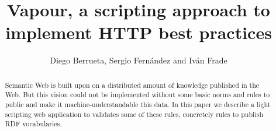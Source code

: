 \documentclass{../templates/llncs}
\begin{document}
\title{Vapour, a scripting  approach to implement HTTP best practices}

\author{Diego Berrueta, Sergio Fern\'andez and Iv\'an Frade}


\maketitle

\begin{abstract}
Semantic Web is built upon on a distributed amount of knowledge published in the 
Web. But this vision could not be implemented without some basic norms and rules 
to public and make it machine-understandable this data. In this paper we describe 
a light scripting web application to validates some of these rules, concretely 
rules to publish RDF vocabularies.
\end{abstract}




\end{document}
